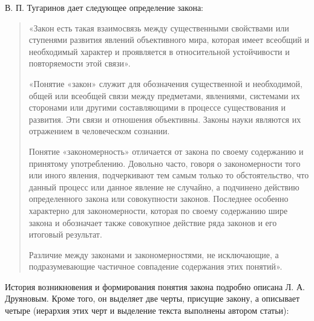\documentclass[11pt,a4paper]{article}
\begin{document}
В. П. Тугаринов дает следующее определение закона: 
\begin{quote}
  «Закон есть такая взаимосвязь между существенными свойствами или ступенями
  развития явлений объективного мира, которая имеет всеобщий и необходимый
  характер и проявляется в относительной устойчивости и повторяемости этой
  связи».

  «Понятие «закон» служит для обозначения существенной и необходимой, общей
  или всеобщей связи между предметами, явлениями, системами их сторонами или
  другими составляющими в процессе существования и развития. Эти связи и
  отношения объективны. Законы науки являются их отражением в человеческом
  сознании.

  Понятие «закономерность» отличается от закона по своему содержанию и
  принятому употреблению. Довольно часто, говоря о закономерности того или
  иного явления, подчеркивают тем самым только то обстоятельство, что данный
  процесс или данное явление не случайно, а подчинено действию определенного
  закона или совокупности законов. Последнее особенно характерно для
  закономерности, которая по своему содержанию шире закона и обозначает также
  совокупное действие ряда законов и его итоговый результат.

  Различие между законами и закономерностями, не исключающие, а
  подразумевающие частичное совпадение содержания этих понятий».
\end{quote}
История возникновения и формирования понятия закона подробно описана
Л. А. Друяновым. Кроме того, он выделяет две черты, присущие закону, а
описывает четыре (иерархия этих черт и выделение текста выполнены автором
статьи):
\end{document}
